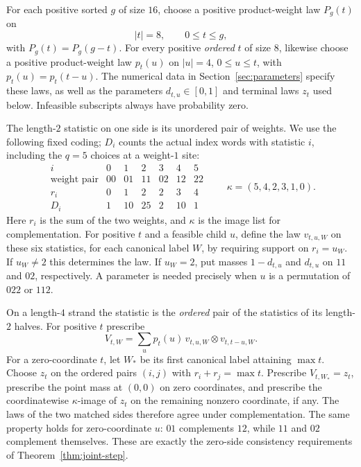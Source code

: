 For each positive sorted $g$ of size $16$, choose a positive
product-weight law $P_g(t)$ on
\[
 |t|=8,\qquad 0\leq t\leq g,
\]
with $P_g(t)=P_g(g-t)$.  For every positive \emph{ordered} $t$ of size
$8$, likewise choose a positive product-weight law $p_t(u)$ on
$|u|=4$, $0\leq u\leq t$, with $p_t(u)=p_t(t-u)$.  The numerical data
in Section~\ref{sec:parameters} specify these laws, as well as the
parameters $d_{t,u}\in[0,1]$ and terminal laws $z_t$ used below.
Infeasible subscripts always have probability zero.

The length-$2$ statistic on one side is its unordered pair of weights.
We use the following fixed coding; $D_i$ counts the actual index words
with statistic $i$, including the $q=5$ choices at a weight-$1$ site:
\begin{equation}\label{eq:pair-statistics}
\begin{array}{c|rrrrrr}
 i&0&1&2&3&4&5\\ \hline
 \text{weight pair}&00&01&11&02&12&22\\
 r_i&0&1&2&2&3&4\\
 D_i&1&10&25&2&10&1
\end{array}
 \qquad \kappa=(5,4,2,3,1,0).
\end{equation}
Here $r_i$ is the sum of the two weights, and $\kappa$ is the image
list for complementation.  For positive $t$ and a feasible child $u$,
define the law $v_{t,u,W}$ on these six statistics, for each canonical
label $W$, by requiring support on $r_i=u_W$.  If $u_W\ne2$ this
determines the law.  If $u_W=2$, put masses $1-d_{t,u}$ and $d_{t,u}$
on $11$ and $02$, respectively.  A parameter is needed precisely when
$u$ is a permutation of $022$ or $112$.

On a length-$4$ strand the statistic is the \emph{ordered} pair of
the statistics of its length-$2$ halves.  For positive $t$ prescribe
\begin{equation}\label{eq:inherited-mixture}
 V_{t,W}=\sum_u p_t(u)\,
       v_{t,u,W}\otimes v_{t,t-u,W}.
\end{equation}
For a zero-coordinate $t$, let $W_*$ be its first canonical label
attaining $\max t$.  Choose $z_t$ on the ordered pairs $(i,j)$ with
$r_i+r_j=\max t$.  Prescribe $V_{t,W_*}=z_t$, prescribe the point mass
at $(0,0)$ on zero coordinates, and prescribe the coordinatewise
$\kappa$-image of $z_t$ on the remaining nonzero coordinate, if any.
The laws of the two matched sides therefore agree under
complementation.  The same property holds for zero-coordinate $u$:
$01$ complements $12$, while $11$ and $02$ complement themselves.
These are exactly the zero-side consistency requirements of
Theorem~\ref{thm:joint-step}.


